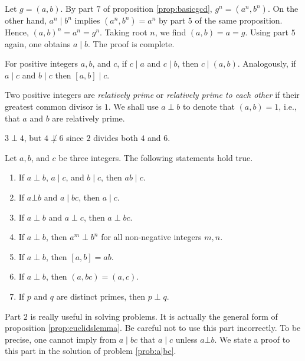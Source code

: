 \documentclass{subfile}
\begin{document}
	\begin{solution}
		Let $g=(a,b)$. By part $7$ of proposition \eqref{prop:basicgcd}, $g^n = (a^n,b^n)$. On the other hand, $a^n\mid b^n$ implies $(a^n, b^n)=a^n$ by part $5$ of the same proposition. Hence, $(a, b)^n=a^n=g^n$. Taking root $n$, we find $(a,b)=a=g$. Using part $5$ again, one obtains $a\mid b$. The proof is complete.

	\end{solution}

	\begin{proposition}\label{prop:dividegcd}
		For positive integers $a, b$, and $c$, if $c \mid a$ and $c\mid b$, then $c\mid (a,b)$. Analogously, if $a\mid c$ and $b\mid c$ then $[a,b]\mid c$.
	\end{proposition}

	\begin{definition}
		Two positive integers are \textit{relatively prime} or \textit{relatively prime to each other} if their greatest common divisor is $1$. We shall use $a\perp b$ to denote that $(a,b)=1$, i.e., that $a$ and $b$ are relatively prime.
	\end{definition}

	\begin{example}
		$3\perp4$, but $4\not\perp6$ since $2$ divides both $4$ and $6$.
	\end{example}

	\begin{proposition}\label{prop:cpdiv}
		Let $a, b$, and $c$ be three integers. The following statements hold true.
		\begin{enumerate}
			\item If $a\perp b$, $a\mid c$, and $b\mid c$, then $ab\mid c$.
			\item If $a \bot b$ and $a\mid bc$, then $a\mid c$.
			\item If $a\perp b$ and $a\perp c$, then $a\perp bc$.
			\item If $a\perp b$, then $a^m\perp b^n$ for all non-negative integers $m,n$.
			\item If $a \perp b$, then $[a,b]=ab$.
			\item If $a \perp b$, then $(a,bc)=(a,c)$.
			\item If $p$ and $q$ are distinct primes, then $p \perp q$.
		\end{enumerate}
	\end{proposition}

	\begin{note}[1]
		Part $2$ is really useful in solving problems. It is actually the general form of proposition \eqref{prop:euclidslemma}. Be careful not to use this part incorrectly. To be precise, one cannot imply from $a\mid bc$ that $a\mid c$ unless $a \bot b$. We state a proof to this part in the solution of problem \eqref{prob:a|bc}.
	\end{note}
\end{document}
